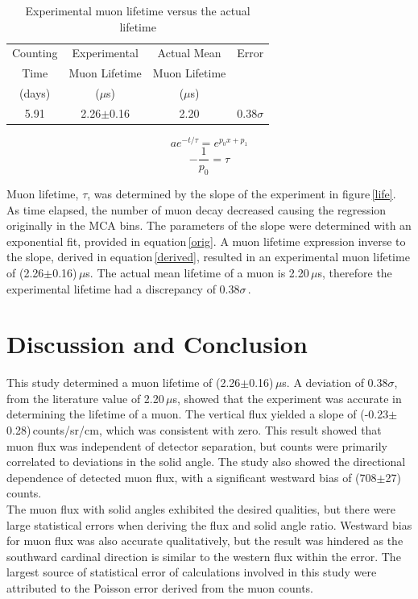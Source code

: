 \documentclass[aps,prl,twocolumn,superscriptaddress,nofootinbib]{revtex4-1}
\begin{document}
\begin{table}[h!] 
\caption{ Experimental muon lifetime versus the actual lifetime}
\label{t1}   %
 \begin{center}   %
    \begin{tabular}{|c|c|c|c|} \hline   %
Counting  & Experimental & Actual Mean & Error \\
 Time   & Muon Lifetime & Muon Lifetime &  \\
 (days) & ($\mu$s)  & ($\mu$s) &   \\ \hline \hline \hline
5.91 & 2.26$\pm$0.16 & 2.20 & 0.38$\sigma$ \\ \hline
     \end{tabular}
  \end{center}
\end{table}

\begin{equation}
ae^{-t/\tau}=e^{p_0x+p_1}
\label{orig}
\end{equation}
\begin{equation}
-\frac{1}{p_0}=\tau
\label{derived}
\end{equation}

 Muon lifetime, $\tau$, was determined by the slope of the experiment in figure\,\ref{life}. As time elapsed, the number of muon decay decreased causing the regression originally in the MCA bins. The parameters of the slope were determined with an exponential fit, provided in equation\,\ref{orig}. A muon lifetime expression inverse to the slope, derived in equation\,\ref{derived}, resulted in an experimental muon lifetime of (2.26$\pm$0.16)\,$\mu$s. The actual mean lifetime of a muon is 2.20\,$\mu$s, therefore the experimental lifetime had a discrepancy of 0.38$\sigma$\,\cite{4}.


\clearpage
\section{Discussion and Conclusion}

This study determined a muon lifetime of (2.26$\pm$0.16)\,$\mu$s. A deviation of 0.38$\sigma$, from the literature value of 2.20\,$\mu$s, showed that the experiment was accurate in determining the lifetime of a muon. The vertical flux yielded a slope of (-0.23$\pm$0.28)\,{counts/sr/cm}, which was consistent with zero. This result showed that muon flux was independent of detector separation, but counts were primarily correlated to deviations in the solid angle. The study also showed the directional dependence of detected muon flux, with a significant westward bias of (708$\pm$27)\,counts.
\\
\indent The muon flux with solid angles exhibited the desired qualities, but there were large statistical errors when deriving the flux and solid angle ratio. Westward bias for muon flux was also accurate qualitatively, but the result was hindered as the southward cardinal direction is similar to the western flux within the error. The largest source of statistical error of calculations involved in this study were attributed to the Poisson error derived from the muon counts.
\vfill\eject
\end{document}
